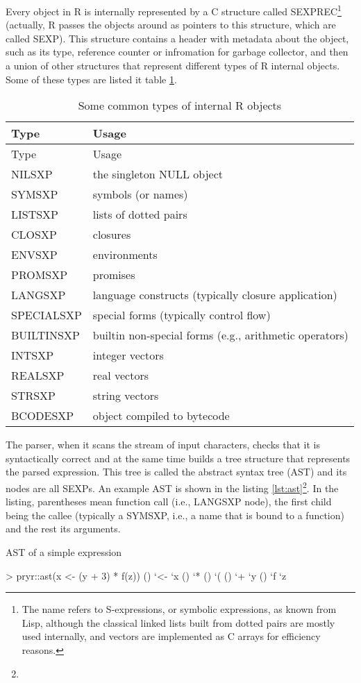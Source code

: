 {Every object in R is internally represented by a C structure called SEXPREC\footnote{The name refers to S-expressions, or symbolic expressions, as known from Lisp, although the classical linked lists built from dotted pairs are mostly used internally, and vectors are implemented as C arrays for efficiency reasons.} (actually, R passes the objects around as pointers to this structure, which are called SEXP). This structure contains a header with metadata about the object, such as its type, reference counter or infromation for garbage collector, and then a union of other structures that represent different types of R internal objects. Some of these types are listed it table \ref{tab:sexp-types}.

\begin{longtable}[c]{@{}ll@{}}
\caption{Some common types of internal R objects\label{tab:sexp-types}} \tabularnewline
\toprule
Type & Usage \tabularnewline
\midrule
\endfirsthead
\toprule
Type & Usage \tabularnewline
\midrule
\endhead
NILSXP & the singleton NULL object \tabularnewline
SYMSXP & symbols (or names) \tabularnewline
LISTSXP & lists of dotted pairs \tabularnewline
CLOSXP & closures \tabularnewline
ENVSXP & environments \tabularnewline
PROMSXP & promises \tabularnewline
LANGSXP & language constructs (typically closure application) \tabularnewline
SPECIALSXP & special forms (typically control flow)\tabularnewline
BUILTINSXP & builtin non-special forms (e.g., arithmetic operators) \tabularnewline
INTSXP & integer vectors \tabularnewline
REALSXP & real vectors \tabularnewline
STRSXP & string vectors \tabularnewline
BCODESXP & object compiled to bytecode \tabularnewline
\bottomrule
\end{longtable}

The parser, when it scans the stream of input characters, checks that it is syntactically correct and at the same time builds a tree structure that represents the parsed expression. This tree is called the abstract syntax tree (AST) and its nodes are all SEXPs. An example AST is shown in the listing \ref{lst:ast}\footnote{}. In the listing, parentheses mean function call (i.e., LANGSXP node), the first child being the callee (typically a SYMSXP, i.e., a name that is bound to a function) and the rest its arguments.

\begin{listing}[htbp]
  \caption{\label{lst:ast}AST of a simple expression}
  \begin{rcode}
> pryr::ast(x <- (y + 3) * f(z))
\- ()
  \- `<-
  \- `x
  \- ()
    \- `*
    \- ()
      \- `(
      \- ()
        \- `+
        \- `y
    \- ()
      \- `f
      \- `z
  \end{rcode}
\end{listing}

}
